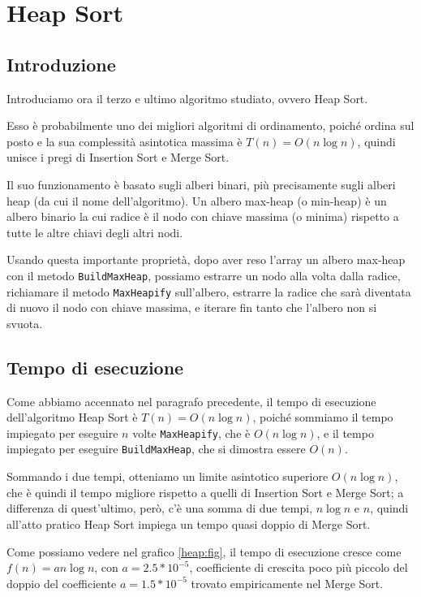 \chapter{Heap Sort}

\section{Introduzione}
Introduciamo ora il terzo e ultimo algoritmo studiato, ovvero Heap Sort.

Esso è probabilmente uno dei migliori algoritmi di ordinamento, poiché ordina sul posto e la sua complessità asintotica massima è $T(n) = O(n\log n)$, quindi unisce i pregi di Insertion Sort e Merge Sort.

Il suo funzionamento è basato sugli alberi binari, più precisamente sugli alberi heap (da cui il nome dell'algoritmo).
Un albero max-heap (o min-heap) è un albero binario la cui radice è il nodo con chiave massima (o minima) rispetto a tutte le altre chiavi degli altri nodi. 

Usando questa importante proprietà, dopo aver reso l'array un albero max-heap con il metodo \verb|BuildMaxHeap|, possiamo estrarre un nodo alla volta dalla radice, richiamare il metodo \verb|MaxHeapify| sull'albero, estrarre la radice che sarà diventata di nuovo il nodo con chiave massima, e iterare fin tanto che l'albero non si svuota.

\section{Tempo di esecuzione}
Come abbiamo accennato nel paragrafo precedente, il tempo di esecuzione dell'algoritmo Heap Sort è $T(n) = O(n \log n)$, poiché sommiamo il tempo impiegato per eseguire $n$ volte \verb|MaxHeapify|, che è $O(n \log n)$, e il tempo impiegato per eseguire \verb|BuildMaxHeap|, che si dimostra essere $O(n)$. 

Sommando i due tempi, otteniamo un limite asintotico superiore $O(n \log n)$, che è quindi il tempo migliore rispetto a quelli di Insertion Sort e Merge Sort; a differenza di quest'ultimo, però, c'è una somma di due tempi, $n \log n$ e $n$, quindi all'atto pratico Heap Sort impiega un tempo quasi doppio di Merge Sort.

Come possiamo vedere nel grafico \ref{heap:fig}, il tempo di esecuzione cresce come $f(n) = a n \log n$, con $a = 2.5 * 10^{-5}$, coefficiente di crescita poco più piccolo del doppio del coefficiente $a = 1.5 * 10^{-5}$ trovato empiricamente nel Merge Sort.

